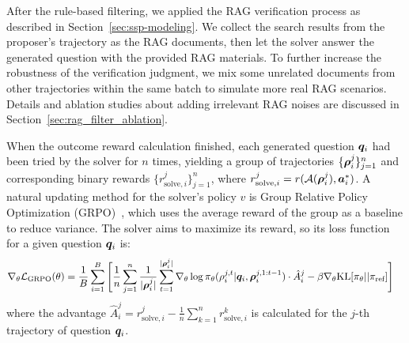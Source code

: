 \documentclass[10pt, a4paper, logo]{googledeepmind} %
\begin{document}
After the rule-based filtering, we applied the RAG verification process as described in Section~\ref{sec:ssp-modeling}. We collect the search results from the proposer's trajectory as the RAG documents, then let the solver answer the generated question with the provided RAG materials. To further increase the robustness of the verification judgment, we mix some unrelated documents from other trajectories within the same batch to simulate more real RAG scenarios. Details and ablation studies about adding irrelevant RAG noises are discussed in Section~\ref{sec:rag_filter_ablation}.

When the outcome reward calculation finished, each generated question ${\bm{q}}_i$ had been tried by the solver for $n$ times, yielding a group of trajectories $\{{\bm{\rho}}_i^j\}_{j=1}^n$ and corresponding binary rewards $\{r_{\text{solve},i}^j\}_{j=1}^n$, where $r_{\text{solve},i}^j = r({\mathcal{A}}({\bm{\rho}}_i^j), {\bm{a}}^*_i)$. A natural updating method for the solver's policy $v$ is Group Relative Policy Optimization (GRPO)~\citep{shao2024deepseekmath}, which uses the average reward of the group as a baseline to reduce variance. The solver aims to maximize its reward, so its loss function for a given question ${\bm{q}}_i$ is:
\begin{align}
    \nabla_\theta {\mathcal{L}}_\text{GRPO} (\theta) = \frac{1}{B} \sum_{i=1}^B \Bigg[ & \frac{1}{n} \sum_{j=1}^{n} \frac{1}{|{\bm{\rho}}_i^j|} \sum_{t=1}^{|{\bm{\rho}}_i^j|}\nabla_\theta \log \pi_\theta(\rho^{j,t}_{i} | {\bm{q}}_i, {\bm{\rho}}^{j,1:t-1}_{i}) \cdot \hat{A}_i^j  - \beta \nabla_\theta \text{KL}[\pi_\theta || \pi_\text{ref}] \Bigg] \label{eq:grpo_solver}
\end{align}
where the advantage $\hat{A}_i^j = r_{\text{solve},i}^j - \frac{1}{n}\sum_{k=1}^n r_{\text{solve},i}^k$ is calculated for the $j$-th trajectory of question ${\bm{q}}_i$. 
\end{document}
